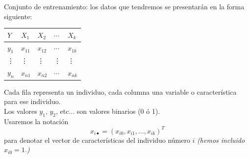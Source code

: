 \documentclass{beamer}
\begin{document}
\begin{frame}
Conjunto de entrenamiento: los datos que tendremos se presentarán en la forma siguiente:
\begin{center}
  \begin{tabular}{lllll}
  $Y$&$X_1$&$X_2$&$\cdots$&$X_k$\\ \hline
$y_1$&$x_{11}$&$x_{12}$&$\cdots$&$x_{1k}$\\
\vdots&\vdots&\vdots&\vdots&\vdots\\
  $y_{n}$&$x_{n1}$&$x_{n2}$&$\cdots$&$x_{nk}$\\
  \end{tabular}
\end{center}
Cada fila representa un individuo, cada columna una variable o característica para ese individuo.\\
Los valores $y_1$, $y_2$, etc... son valores binarios (0 ó 1).\\
 Usaremos la notación $$x_{i\bullet}=(x_{i0},x_{i1},\dots,x_{ik})^T$$ para denotar el vector de características del individuo número $i$ \textit{(hemos incluido $x_{i0}=1$.)}

\end{frame}
\end{document}
